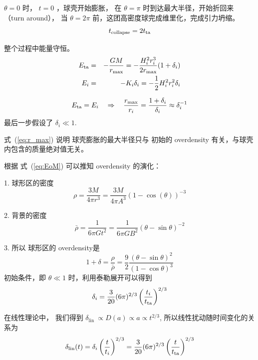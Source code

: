 \documentclass[12pt]{ctexart}
\newcommand{\refeq}[1]{式~(\ref{#1})}
\begin{document}
$\theta=0$ 时， $t=0$ ，球壳开始膨胀，
在 $\theta=\pi$ 时到达最大半径，开始折回来 （turn around），
当 $\theta= 2\pi$ 前，这团高密度球完成维里化，完成引力坍缩。
\begin{equation}
    t_{\rm{collapse}} = 2 t_{\rm{ta}}
\end{equation}

整个过程中能量守恒。
\begin{eqnarray}
    E_{\rm{ta}}  &=& -\frac{GM}{r_{\rm{max}}} = -\frac{H_i^2 r_i^3}{2 r_{\rm{max}} } (1+\delta_i) \\ 
    E_i &=& -K_i \delta_i = -\frac{1}{2} H_i^2 r_i^2 \delta_i
\end{eqnarray}

\begin{equation} \label{eq:r_max}
    E _{\rm{ta}} = E_i \quad \Rightarrow \quad \frac{r_{\max }}{r_{i}}=\frac{1+\delta_{i}}{\delta_{i}} \approx \delta_{i}^{-1}
\end{equation}
最后一步假设了 $\delta_i \ll 1$.

\refeq{eq:r_max} 说明 球壳膨胀的最大半径只与 初始的 overdensity 有关，与球壳内包含的质量绝对值无关。

根据 \refeq{eq:EoM} 可以推知 overdensity 的演化：

1. 球形区的密度
\begin{equation}
    \rho=\frac{3 M}{4 \pi r^{3}}=\frac{3 M}{4 \pi A^{3}}(1-\cos (\theta))^{-3}
\end{equation}

2. 背景的密度
\begin{equation}
    \bar{\rho}=\frac{1}{6 \pi G t^{2}}=\frac{1}{6 \pi G B^{2}}(\theta-\sin \theta)^{-2}
\end{equation}

3. 所以 球形区的 overdensity是
\begin{equation}
    1+\delta=\frac{\rho}{\bar{\rho}}=\frac{9}{2} \frac{(\theta-\sin \theta)^{2}}{(1-\cos \theta)^{3}}
\end{equation}
初始条件，即 $\theta \ll 1$ 时，利用泰勒展开可以得到
\begin{equation}
    \delta_{i}=\frac{3}{20}(6 \pi)^{2 / 3}\left(\frac{t_{i}}{t_{\rm{ta} }}\right)^{2 / 3}
\end{equation}

在线性理论中， 我们得到 $\delta_{\text {lin }} \propto D(a) \propto a \propto t^{2 / 3}$, 所以线性扰动随时间变化的关系为
\begin{eqnarray}
    \delta_{\operatorname{lin}}(t)=\delta_{i}\left(\frac{t}{t_{i}}\right)^{2 / 3}=\frac{3}{20}(6 \pi)^{2 / 3}\left(\frac{t}{t_{\rm{ta} }}\right)^{2 / 3}
\end{eqnarray}
\end{document}
